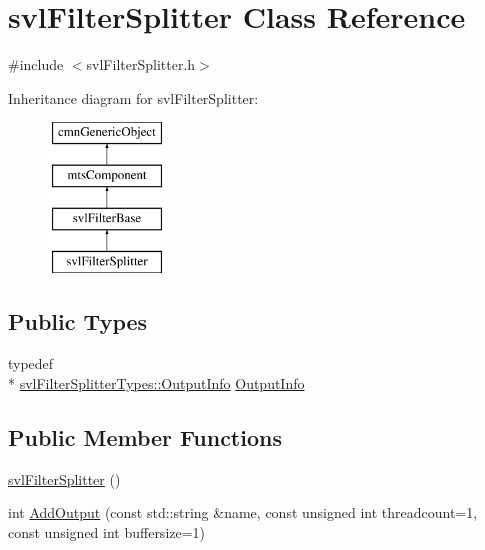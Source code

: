 \hypertarget{classsvl_filter_splitter}{\section{svl\-Filter\-Splitter Class Reference}
\label{classsvl_filter_splitter}
}


{\ttfamily \#include $<$svl\-Filter\-Splitter.\-h$>$}

Inheritance diagram for svl\-Filter\-Splitter\-:\begin{figure}[H]
\begin{center}
\leavevmode
\includegraphics[height=4.000000cm]{db/d8e/classsvl_filter_splitter}
\end{center}
\end{figure}
\subsection*{Public Types}
\begin{DoxyCompactItemize}
\item 
typedef \\*
\hyperlink{classsvl_filter_splitter_types_1_1_output_info}{svl\-Filter\-Splitter\-Types\-::\-Output\-Info} \hyperlink{classsvl_filter_splitter_a21cb33e85d6f3ebafae8b753210a9ff9}{Output\-Info}
\end{DoxyCompactItemize}
\subsection*{Public Member Functions}
\begin{DoxyCompactItemize}
\item 
\hyperlink{classsvl_filter_splitter_a50e97bbd5a557965a57c9886db15e262}{svl\-Filter\-Splitter} ()
\item 
int \hyperlink{classsvl_filter_splitter_aed61ad571ff07d744e0252435620b10e}{Add\-Output} (const std\-::string \&name, const unsigned int threadcount=1, const unsigned int buffersize=1)
\end{DoxyCompactItemize}

